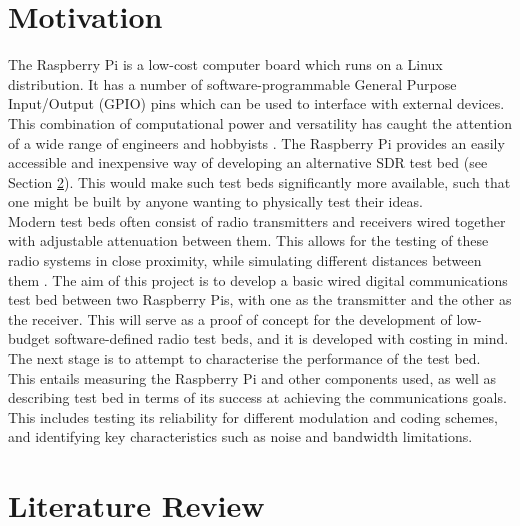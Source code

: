 \documentclass[../main.tex]{subfiles}
\begin{document}
\section{Motivation}

The Raspberry Pi is a low-cost computer board which runs on a Linux distribution.
It has a number of software-programmable General Purpose Input/Output (GPIO) pins which can be used to interface with external devices.
This combination of computational power and versatility has  caught the attention of a wide range of engineers and hobbyists \cite{web_AboutPi}.
The Raspberry Pi provides an easily accessible and inexpensive way of developing an alternative SDR test bed (see Section \ref{sec_Lit Review}).
This would make such test beds significantly more available, such that one might be built by anyone wanting to physically test their ideas.\\

Modern test beds often consist of radio transmitters and receivers wired together with adjustable attenuation between them.
This allows for the testing of these radio systems in close proximity, while simulating different distances between them \cite{pap_MilitaryRadioTB}.
The aim of this project is to develop a basic wired digital communications test bed between two Raspberry Pis, with one as the transmitter and the other as the receiver.
This will serve as a proof of concept for the development of low-budget software-defined radio test beds, and it is developed with costing in mind.
The next stage is to attempt to characterise the performance of the test bed.
This entails measuring the Raspberry Pi and other components used, as well as describing test bed in terms of its success at achieving the communications goals.
This includes testing its reliability for different modulation and coding schemes, and identifying key characteristics such as noise and bandwidth limitations.\\


\section{Literature Review} \label{sec_Lit Review}
\end{document}
